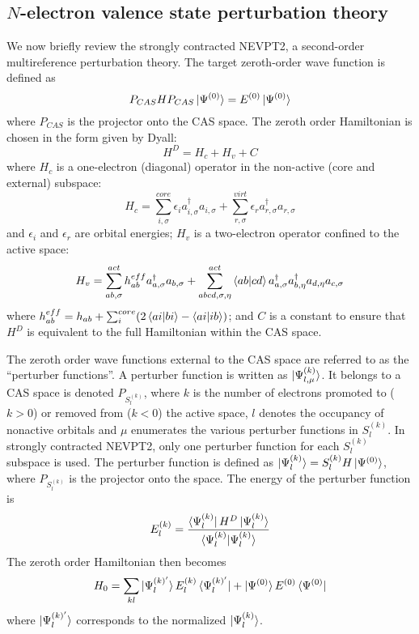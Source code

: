 \subsection{$N$-electron valence state perturbation theory} 

We now briefly review the strongly contracted NEVPT2\cite{angeli_n-electron_2001, angeli_n-electron_2002}, a second-order 
multireference perturbation theory. The target zeroth-order wave function is defined as 
\begin{equation}
P_{CAS}HP_{CAS} \ket{\Psi^{(0)}} = E^{(0)} \ket{\Psi^{(0)}}
\end{equation}
where $P_{CAS}$ is the projector onto the CAS space. 
The zeroth order Hamiltonian is chosen in the form given by Dyall\cite{dyall_choice_1995}:
\begin{equation}
  H^D = H_c + H_v + C
\end{equation}
where $H_c$ is a one-electron (diagonal) operator in the non-active (core and external) subspace:
\begin{equation}
  H_c = \sum_{i,\sigma}^{core} \epsilon_i  a^\dagger_{i,\sigma} a_{i,\sigma} + \sum_{r,\sigma}^{virt} \epsilon_r  a^\dagger_{r,\sigma} a_{r,\sigma}
\end{equation}
and $\epsilon_i $ and $\epsilon_r$ are orbital energies; 
$H_v$ is a two-electron operator confined to the active space:
\begin{equation}
  H_v = \sum_{ab,\sigma}^{act} h^{eff}_{ab}  a^\dagger_{a,\sigma}  a_{b,\sigma} + \sum_{abcd,\sigma,\eta}^{act} \braket{ab|cd}  a^\dagger_{a,\sigma} a^\dagger_{b,\eta} a_{d,\eta} a_{c,\sigma}
\end{equation}
where $h_{ab}^{eff} = h_{ab} + \sum_{i}^{core} (2\braket{ai|bi}-\braket{ai|ib})$;
and $C$ is a constant to ensure that $H^D$ is equivalent to the full Hamiltonian within the CAS space.

The zeroth order wave functions external to the CAS space are referred to as the ``perturber functions''. A perturber function is written  as $\ket{\Psi^{(k)}_{l,\mu}}$.
It belongs to a CAS space is denoted $P_{S_l^{(k)}}$, where $k$ is the number of electrons promoted to ($k>0$) or removed from ($k<0$) the active space, $l$ denotes the occupancy of nonactive orbitals and $\mu$ enumerates the various perturber functions in $S_l^{(k)}$.  
In strongly contracted NEVPT2, only one perturber function for each $S_l^{(k)}$ subspace is used. The perturber function is defined as $\ket{\Psi^{(k)}_l} = S^{(k)}_l H \ket{\Psi^{(0)}}$, where $P_{S_l^{(k)}}$ is the projector onto the space. The energy of
the perturber function is
\begin{equation}
  E^{(k)}_l = \frac{\bra{\Psi^{(k)}_l}H^D\ket{\Psi^{(k)}_l}}{\braket{\Psi^{(k)}_l|\Psi^{(k)}_l}}
\end{equation}
The zeroth order Hamiltonian then becomes
\begin{equation}
  H_0 = \sum_{kl} \ket{\Psi^{(k)'}_l}E^{(k)}_l \bra{\Psi^{(k)'}_l} +\ket{\Psi^{(0)}}E^{(0)} \bra{\Psi^{(0)}}
\end{equation}
where $\ket{\Psi^{(k)'}_l}$ corresponds to the normalized $\ket{\Psi^{(k)}_l}$.

